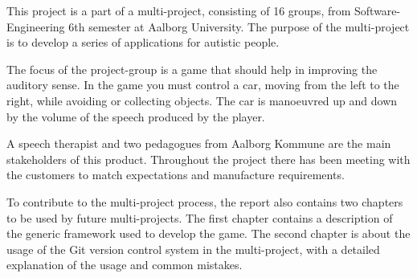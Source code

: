 This project is a part of a multi-project, consisting of 16 groups, from Software-Engineering 6th semester at Aalborg University.
The purpose of the multi-project is to develop a series of applications for autistic people.

The focus of the project-group is a game that should help in improving the auditory sense.
In the game you must control a car, moving from the left to the right, while avoiding or collecting objects.
The car is manoeuvred up and down by the volume of the speech produced by the player.

A speech therapist and two pedagogues from Aalborg Kommune are the main stakeholders of this product.
Throughout the project there has been meeting with the customers to match expectations and manufacture requirements.

To contribute to the multi-project process, the report also contains two chapters to be used by future multi-projects. The first chapter contains a description of the generic framework used to develop the game.
The second chapter is about the usage of the Git version control system in the multi-project, with a detailed explanation of the usage and common mistakes.
